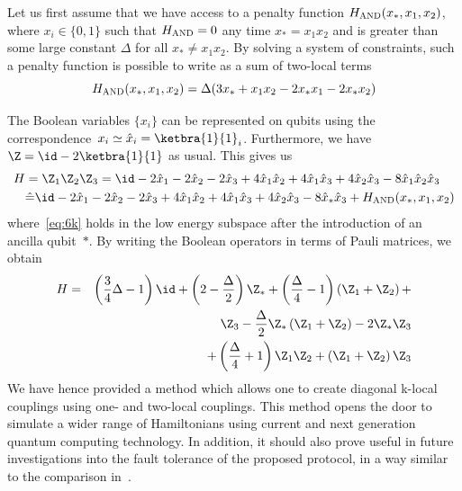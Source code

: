 \documentclass[11pt,oneside,final]{huthesis}%
\begin{document}
Let us first assume that we have access to a penalty function
$H_{\textsc{AND}}(x_*,x_1,x_2)$, where $x_i\in\{0,1\}$ such that
$H_{\textsc{AND}} = 0$ any time $x_* = x_1 x_2$ and is greater than some
large constant $\Delta$ for all $x_* \neq x_1 x_2$.
By solving a system of constraints, such a penalty function is
possible to write as a sum of two-local terms
\begin{equation}\label{eqn:Hwedge}
H_{\textsc{AND}}(x_*,x_1,x_2) = \Delta(3x_* +x_1 x_2-2x_* x_1-2x_* x_2)
\end{equation}

The Boolean variables $\{x_i\}$ can be represented on qubits using the
correspondence~$x_i \simeq \hat{x}_i = \ketbra{1}{1}_i$. Furthermore, we have
$\Z = \id-2\ketbra{1}{1}$ as usual.
This gives us
\begin{align}
\notag
H &= \Z_1 \Z_2 \Z_3 =
\id -2 \hat{x}_1 -2 \hat{x}_2 -2 \hat{x}_3
+4 \hat{x}_1 \hat{x}_2 +4 \hat{x}_1 \hat{x}_3 +4 \hat{x}_2 \hat{x}_3
-8 \hat{x}_1 \hat{x}_2 \hat{x}_3\\
\label{eq:6k}
&\hat{=} \id -2 \hat{x}_1 -2 \hat{x}_2 -2 \hat{x}_3
+4 \hat{x}_1 \hat{x}_2 +4 \hat{x}_1 \hat{x}_3 +4 \hat{x}_2 \hat{x}_3
-8 \hat{x}_* \hat{x}_3 +H_{\textsc{AND}}(x_*,x_1,x_2)
\end{align}
where~\eqref{eq:6k} holds in the low energy subspace after the
introduction of an ancilla qubit~$*$.
By writing the Boolean operators in terms of Pauli matrices, we obtain
\begin{eqnarray*}
H &=& \left(\frac{3}{4} \Delta -1\right) \id+\left(2-\frac{\Delta}{2}\right) \Z_* +\left(\frac{\Delta}{4}-1\right) \left(\Z_1+\Z_2\right) +\\
&&\Z_3-\frac{\Delta}{2} \Z_* \left(\Z_1+\Z_2\right) -2 \Z_* \Z_3\\
&&+\left(\frac{\Delta}{4}+1\right) \Z_1 \Z_2 +\left(\Z_1+\Z_2\right) \Z_3
\end{eqnarray*}
We have hence provided a method which allows one to create diagonal
k-local couplings using one- and two-local couplings.  This method opens the
door to simulate a wider range of Hamiltonians using current and next
generation quantum computing technology.  In addition, it should also
prove useful in future investigations into the fault tolerance of the
proposed protocol, in a way similar to the comparison
in~\cite{Brown06}.
\end{document}
